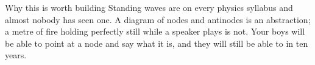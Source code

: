 \begin{telospanel}{Why this is worth building}
Standing waves are on every physics syllabus and almost nobody has seen one. A
diagram of nodes and antinodes is an abstraction; a metre of fire holding
perfectly still while a speaker plays is not. Your boys will be able to point at
a node and say what it is, and they will still be able to in ten years.
\end{telospanel}


